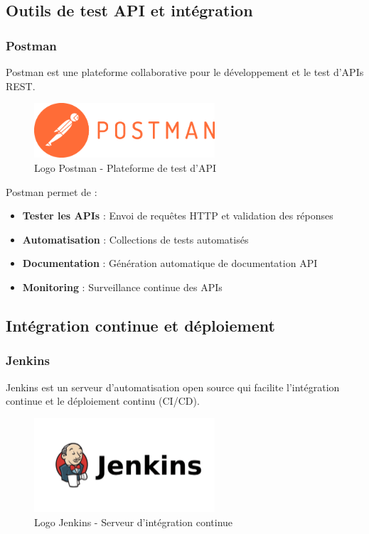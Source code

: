 \documentclass[12pt,a4paper]{report}
\begin{document}
\subsection{Outils de test API et intégration}

\subsubsection{Postman}

Postman est une plateforme collaborative pour le développement et le test d'APIs REST.

\begin{figure}[htbp]
    \centering
    \includegraphics[width=0.6\textwidth]{latex_media/media/postman.png}
    \caption{Logo Postman - Plateforme de test d'API}
    \label{fig:postman-logo}
\end{figure}

Postman permet de :
\begin{itemize}
    \item \textbf{Tester les APIs} : Envoi de requêtes HTTP et validation des réponses
    \item \textbf{Automatisation} : Collections de tests automatisés
    \item \textbf{Documentation} : Génération automatique de documentation API
    \item \textbf{Monitoring} : Surveillance continue des APIs
\end{itemize}

\subsection{Intégration continue et déploiement}

\subsubsection{Jenkins}

Jenkins est un serveur d'automatisation open source qui facilite l'intégration continue et le déploiement continu (CI/CD).

\begin{figure}[htbp]
    \centering
    \includegraphics[width=0.6\textwidth]{latex_media/media/jenkins.png}
    \caption{Logo Jenkins - Serveur d'intégration continue}
    \label{fig:jenkins-logo}
\end{figure}
\end{document}
